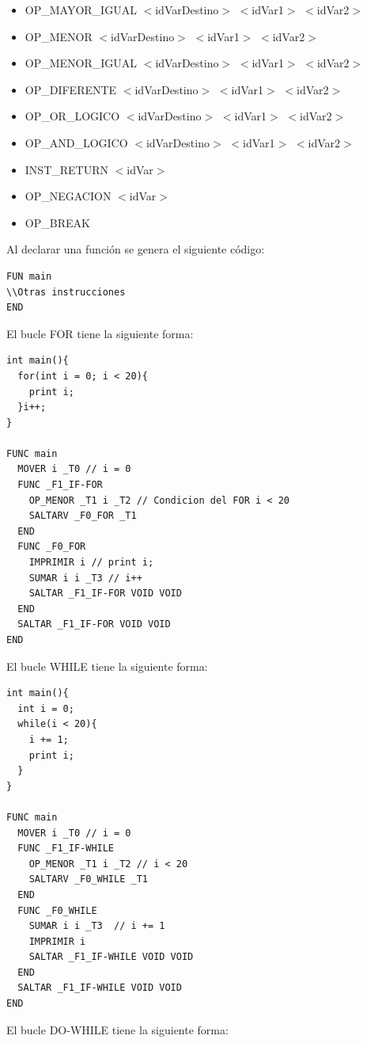 \documentclass[a4paper,12pt]{article}
\begin{document}
\begin{enumerate}
\begin{enumerate}
\begin{itemize}
\begin{itemize}
   \item OP\_MAYOR\_IGUAL $<$idVarDestino$>$ $<$idVar1$>$ $<$idVar2$>$
   \item OP\_MENOR $<$idVarDestino$>$ $<$idVar1$>$ $<$idVar2$>$
   \item OP\_MENOR\_IGUAL $<$idVarDestino$>$ $<$idVar1$>$ $<$idVar2$>$
   \item OP\_DIFERENTE $<$idVarDestino$>$ $<$idVar1$>$ $<$idVar2$>$
   \item OP\_OR\_LOGICO $<$idVarDestino$>$ $<$idVar1$>$ $<$idVar2$>$
   \item OP\_AND\_LOGICO $<$idVarDestino$>$ $<$idVar1$>$ $<$idVar2$>$
   \item INST\_RETURN $<$idVar$>$
   \item OP\_NEGACION $<$idVar$>$
   \item OP\_BREAK
   \end{itemize}
   
   
   Al declarar una función se genera el siguiente código:
   
   \begin{lstlisting}
FUN main
\\Otras instrucciones
END
   \end{lstlisting}

   El bucle FOR tiene la siguiente forma:
   
   \begin{lstlisting}
int main(){
  for(int i = 0; i < 20){
    print i;
  }i++;
}
   
FUNC main
  MOVER i _T0 // i = 0
  FUNC _F1_IF-FOR
    OP_MENOR _T1 i _T2 // Condicion del FOR i < 20
    SALTARV _F0_FOR _T1
  END
  FUNC _F0_FOR
    IMPRIMIR i // print i;
    SUMAR i i _T3 // i++
    SALTAR _F1_IF-FOR VOID VOID
  END
  SALTAR _F1_IF-FOR VOID VOID
END
   \end{lstlisting}

   El bucle WHILE tiene la siguiente forma:

   \begin{lstlisting}
int main(){
  int i = 0;
  while(i < 20){
    i += 1;
    print i;
  }
}

FUNC main
  MOVER i _T0 // i = 0
  FUNC _F1_IF-WHILE
    OP_MENOR _T1 i _T2 // i < 20
    SALTARV _F0_WHILE _T1
  END
  FUNC _F0_WHILE
    SUMAR i i _T3  // i += 1
    IMPRIMIR i
    SALTAR _F1_IF-WHILE VOID VOID
  END
  SALTAR _F1_IF-WHILE VOID VOID
END
   \end{lstlisting}
   
   El bucle DO-WHILE tiene la siguiente forma:
   

\end{itemize}
\end{enumerate}
\end{enumerate}
\end{document}
